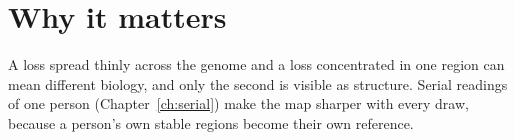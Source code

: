 \section{Why it matters}

A loss spread thinly across the genome and a loss concentrated in one region can mean different biology, and only the
second is visible as structure. Serial readings of one person (Chapter~\ref{ch:serial}) make the map sharper with every draw,
because a person's own stable regions become their own reference.
